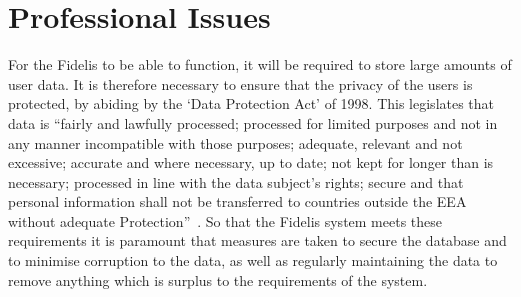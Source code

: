 \section{Professional Issues}
For the Fidelis to be able to function, it will be required to store large amounts of user data. It is therefore necessary to ensure that the privacy of the users is protected, by abiding by the `Data Protection Act' of 1998. This legislates that data is ``fairly and lawfully processed; processed for limited purposes and not in any manner incompatible with those purposes;
adequate, relevant and not excessive; accurate and where necessary, up to date; not kept for longer than is necessary; processed in line with the data subject's rights; secure and that personal information shall not be transferred to countries outside the EEA without adequate
Protection''~\cite{DPA}. So that the Fidelis system meets these requirements it is paramount that measures are taken to secure the database and to minimise corruption to the data, as well as regularly maintaining the data to remove anything which is surplus to the requirements of the system.